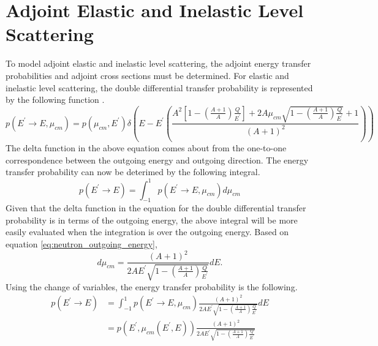 \section{Adjoint Elastic and Inelastic Level Scattering}
To model adjoint elastic and inelastic level scattering, the adjoint energy
transfer probabilities and adjoint cross sections must be determined. For
elastic and inelastic level scattering, the double differential transfer
probability is represented by the following function 
\citep{hoogenboom_adjoint_1977}.
\begin{equation}
  p(E^{'} \to E, \mu_{cm}) = p(\mu_{cm},E^{'})\delta\left(E - 
  E^{'} \left(\frac{A^2\left[1-\left(\frac{A+1}{A}\right)\frac{Q}{E^{'}}
      \right]+ 2A\mu_{cm}\sqrt{1 - \left(\frac{A+1}{A}\right)\frac{Q}{E^{'}}}
     + 1}{\left(A+1\right)^2}\right)\right)
\end{equation}
The delta function in the above equation comes about from the one-to-one 
correspondence between the outgoing energy and outgoing direction. The energy
transfer probability can now be deterimed by the following integral.
\begin{equation}
  p(E^{'} \to E) = \int_{-1}^1 p(E^{'} \to E, \mu_{cm}) d\mu_{cm}
\end{equation}
Given that the delta function in the equation for the double differential
transfer probability is in terms of the outgoing energy, the above integral
will be more easily evaluated when the integration is over the outgoing energy.
Based on equation \ref{eq:neutron_outgoing_energy},
\begin{equation}
  d\mu_{cm} = \frac{(A+1)^2}{2AE^{'}\sqrt{1-\left(\frac{A+1}{A}\right)
      \frac{Q}{E^{'}}}} dE.
\end{equation}
Using the change of variables, the energy transfer probability is the following.
\begin{align}
  p(E^{'} \to E) & = \int_{-1}^1 p(E^{'} \to E, \mu_{cm}) 
  \frac{(A+1)^2}{2AE^{'}\sqrt{1-\left(\frac{A+1}{A}\right)\frac{Q}{E^{'}}}} dE
  \nonumber \\
  & = p(E^{'}, \mu_{cm}(E^{'},E)) 
  \frac{(A+1)^2}{2AE^{'}\sqrt{1-\left(\frac{A+1}{A}\right)\frac{Q}{E^{'}}}}
\end{align}

